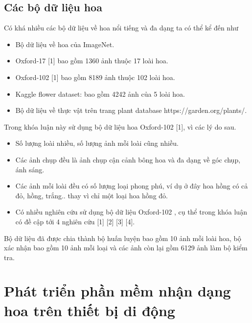 \documentclass[12pt]{report}
\begin{document}
										
		\section{Các bộ dữ liệu hoa}
		Có khá nhiều các bộ dữ liệu về hoa nổi tiếng và đa dạng ta có thể kể đến như	
		\begin{itemize}
			\item Bộ dữ liệu về hoa của ImageNet.
			\item Oxford-17 [1] bao gồm 1360 ảnh thuộc 17 loài hoa.
			\item Oxford-102 [1] bao gồm 8189 ảnh thuộc 102 loài hoa. 
			\item Kaggle flower dataset: bao gồm 4242 ảnh của 5 loài hoa.
			\item Bộ dữ liệu về thực vật trên trang plant database https://garden.org/plants/.
		\end{itemize}		
						
		Trong khóa luận này sử dụng bộ dữ liệu hoa Oxford-102 [1], vì các lý do sau.
		
		\begin{itemize}
			\item Số lượng loài nhiều, số lượng ảnh mỗi loài cũng nhiều.
			\item Các ảnh chụp đều là ảnh chụp cận cảnh bông hoa và đa dạng về góc chụp, ánh sáng.
			\item Các ảnh mỗi loài đều có số lượng loại phong phú, ví dụ ở đây hoa hồng có cả đỏ, hồng, trắng.. thay vì chỉ một loại hoa hồng đỏ.
			\item Có nhiều nghiên cứu sử dụng bộ dữ liệu Oxford-102 \cite{cia-Nilsback06}, cụ thể trong khóa luận có đề cập tới 4 nghiên cứu [1] [2] [3] [4].
		\end{itemize}				
						
		Bộ dữ liệu đã được chia thành bộ huấn luyện bao gồm 10 ảnh mỗi loài hoa, bộ xác nhận bao gồm 10 ảnh mỗi loại và các ảnh còn lại gồm 6129 ảnh làm bộ kiểm tra. 	
						
		\newpage
		\chapter{Phát triển phần mềm nhận dạng hoa trên thiết bị di động}
		\label{chap:solution}
		\section{}
										
						
						
\end{document}
